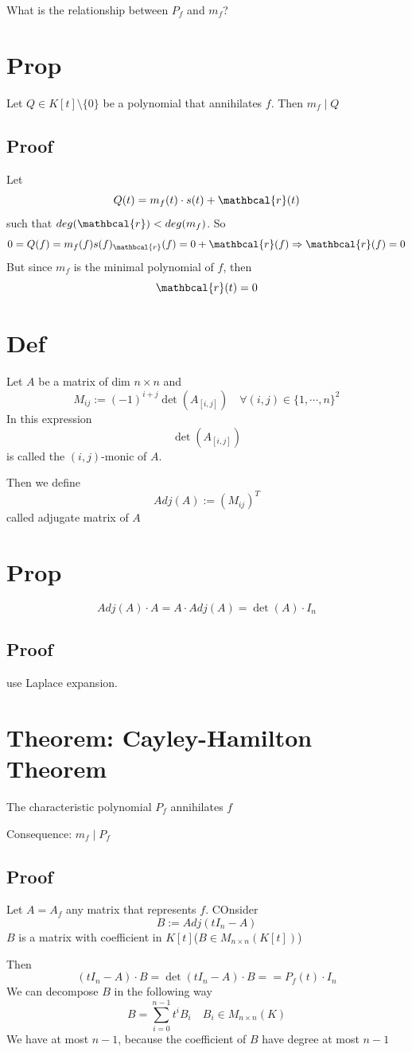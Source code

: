 \documentclass{book}
\begin{document}
What is the relationship between $P_f$ and $m_f$?  
\section{Prop}
Let $Q\in K[t]\setminus\{0\}$ be a polynomial that annihilates $f$. Then $m_f\mid Q$ 
\subsection*{Proof}
Let $$Q(t)=m_f(t)\cdot s(t)+\mathbcal{r}(t)$$
such that $deg(\mathbcal{r})< deg(m_f)$. So
$$0=Q(f)=m_f(f)s(f)_\mathbcal{r}(f)=0+\mathbcal{r}(f)\Rightarrow \mathbcal{r}(f)=0$$
But since $m_f$ is the minimal polynomial of $f$, then $$\mathbcal{r}(t)=0$$
\section{Def}
Let $A$ be a matrix of dim $n\times n$ and $$M_{ij}:=(-1)^{i+j}\det(A_{[i,j]})\quad \forall (i,j)\in \{1,\cdots,n\}^2$$
In this expression $$\det(A_{[i,j]})$$ is called the $(i,j)$-monic of $A$.

Then we define$$Adj(A):=(M_{ij})^T$$ called adjugate matrix of $A$
\section{Prop}
$$Adj(A)\cdot A=A\cdot Adj(A)=\det(A)\cdot I_n$$
\subsection*{Proof}
use Laplace expansion.
\section{Theorem: Cayley-Hamilton Theorem}
The characteristic polynomial $P_f$ annihilates $f$

Consequence: $m_f\mid P_f$
\subsection*{Proof}
Let $A=A_f$ any matrix that represents $f$. COnsider $$B:=Adj(tI_n-A)$$
$B$ is a matrix with coefficient in $K[t]$($B\in M_{n\times n}(K[t])$)

Then$$(tI_n-A)\cdot B=\det(tI_n-A)\cdot B==P_f(t)\cdot I_n$$
We can decompose $B$ in the following way
$$B=\sum\limits_{i=0}^{n-1}t^iB_i\quad B_i\in M_{n\times n}(K)$$
We have at most $n-1$, because the coefficient of $B$ have degree at most $n-1$
\end{document}
